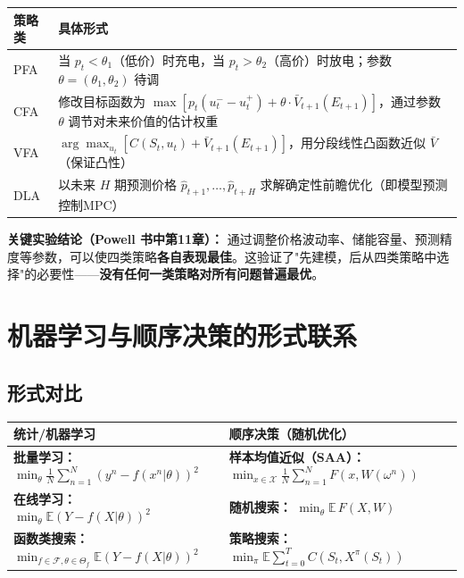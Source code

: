 \documentclass[11pt, a4paper]{article}
\begin{document}
\begin{center}
\begin{tabular}{lp{11cm}}
\toprule
\textbf{策略类} & \textbf{具体形式} \\
\midrule
PFA & 当 $p_t < \theta_1$（低价）时充电，当 $p_t > \theta_2$（高价）时放电；参数 $\theta = (\theta_1, \theta_2)$ 待调 \\
\addlinespace
CFA & 修改目标函数为 $\max [p_t(u_t^- - u_t^+) + \theta \cdot \bar{V}_{t+1}(E_{t+1})]$，通过参数 $\theta$ 调节对未来价值的估计权重 \\
\addlinespace
VFA & $\arg\max_{u_t}\!\left[C(S_t, u_t) + \bar{V}_{t+1}(E_{t+1})\right]$，用分段线性凸函数近似 $\bar{V}$（保证凸性） \\
\addlinespace
DLA & 以未来 $H$ 期预测价格 $\hat{p}_{t+1}, \ldots, \hat{p}_{t+H}$ 求解确定性前瞻优化（即模型预测控制MPC） \\
\bottomrule
\end{tabular}
\end{center}

\noindent\textbf{关键实验结论（Powell 书中第11章）：} 通过调整价格波动率、储能容量、预测精度等参数，可以使四类策略\textbf{各自表现最佳}。这验证了"先建模，后从四类策略中选择"的必要性——\textbf{没有任何一类策略对所有问题普遍最优}。

\section{机器学习与顺序决策的形式联系}

\subsection{形式对比}

\begin{center}
\begin{tabular}{ll}
\toprule
\textbf{统计/机器学习} & \textbf{顺序决策（随机优化）} \\
\midrule
\textbf{批量学习：} $\min_\theta \frac{1}{N}\sum_{n=1}^N (y^n - f(x^n|\theta))^2$ & \textbf{样本均值近似（SAA）：} $\min_{x \in \mathcal{X}} \frac{1}{N}\sum_{n=1}^N F(x, W(\omega^n))$ \\
\addlinespace
\textbf{在线学习：} $\min_\theta \mathbb{E}(Y - f(X|\theta))^2$ & \textbf{随机搜索：} $\min_\theta \mathbb{E}\,F(X, W)$ \\
\addlinespace
\textbf{函数类搜索：} $\min_{f \in \mathcal{F}, \theta \in \Theta_f} \mathbb{E}(Y - f(X|\theta))^2$ & \textbf{策略搜索：} $\min_\pi \mathbb{E}\!\sum_{t=0}^T C(S_t, X^\pi(S_t))$ \\
\bottomrule
\end{tabular}
\end{center}
\end{document}
